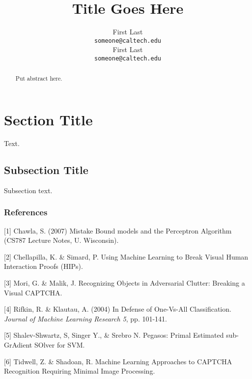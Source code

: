 \documentclass{article}
\title{Title Goes Here}
\author{
First Last\\
\texttt{someone@caltech.edu} \\
\And
First Last \\
\texttt{someone@caltech.edu} \\
}
\begin{document}
\maketitle

\begin{abstract}
Put abstract here.
\end{abstract}

\section{Section Title}

Text.



\subsection{Subsection Title}

Subsection text.



\subsubsection*{References}

\small{

[1] Chawla, S. (2007) Mistake Bound models and the Perceptron Algorithm (CS787 Lecture Notes, U. Wisconsin).

[2] Chellapilla, K. \& Simard, P.  Using Machine Learning to Break Visual Human Interaction Proofs (HIPs).

[3] Mori, G. \& Malik, J.  Recognizing Objects in Adversarial Clutter: Breaking a Visual CAPTCHA.

[4] Rifkin, R. \& Klautau, A. (2004) In Defense of One-Vs-All Classification. {\it Journal of Machine Learning Research 5}, pp. 101-141.

[5] Shalev-Shwartz, S, Singer Y., \& Srebro N.  Pegasos: Primal Estimated sub-GrAdient SOlver for SVM.

[6] Tidwell, Z. \& Shadoan, R.  Machine Learning Approaches to CAPTCHA Recognition Requiring Minimal Image Processing.

}
\end{document}

